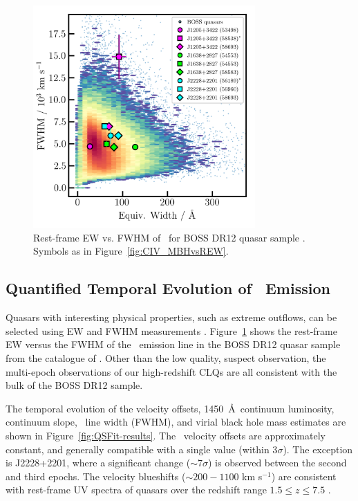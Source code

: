 \documentclass[fleqn,usenatbib]{mnras}
\begin{document}
\begin{figure}
  \centering
  \includegraphics[width=8.5cm, trim=0.2cm 0.2cm 0.0cm 0.2cm, clip]
  {figures/CIV_CLQs_REWvsFWHM_20200519.png}
  \vspace{-12pt}
  \caption[]{Rest-frame EW vs. FWHM of \civ\
    for BOSS DR12 quasar sample \citep{Hamann2017}.
   Symbols as in Figure~\ref{fig:CIV_MBHvsREW}.}
  \label{fig:REWvsFWHM}
\end{figure}

\subsection{Quantified Temporal Evolution of \civ\ Emission}
Quasars with interesting physical properties, such as extreme
outflows, can be selected using EW and FWHM measurements \citep[e.g.,
``Extremely Red Quasars'' ---][]{Ross2015, Zakamska2016, Zakamska2019,
Hamann2017}. Figure~\ref{fig:REWvsFWHM} shows the rest-frame EW versus
the FWHM of the \civ\ emission line in the BOSS DR12 quasar sample
from the catalogue of \citet{Hamann2017}.  Other than the low quality,
suspect observation, the multi-epoch observations of our high-redshift
CLQs are all consistent with the bulk of the BOSS DR12 sample.

The temporal evolution of the velocity offsets, 1450~\AA\ continuum
luminosity, continuum slope, \civ\ line width (FWHM), and virial black
hole mass estimates are shown in Figure~\ref{fig:QSFit-results}.  The
\civ\ velocity offsets are approximately constant, and generally
compatible with a single value (within 3$\sigma$).  The exception is
J2228+2201, where a significant change ($\sim$7$\sigma$) is observed
between the second and third epochs. The velocity blueshifts ($\sim
200-1100$ km s$^{-1}$) are consistent with rest-frame UV spectra of
quasars over the redshift range $1.5 \leq z \leq 7.5$
\citep[e.g.,][]{Meyer2019}.
\end{document}
